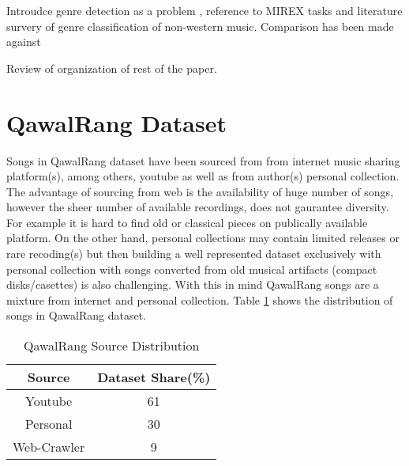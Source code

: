 \documentclass{article}
\begin{document}
Introudce genre detection as a problem \citep{music_genre_survey}, reference to MIREX tasks and literature survery of genre classification of non-western music. Comparison has been made against \citep{gtzan}

Review of organization of rest of the paper.

\section{QawalRang Dataset}\label{sec:data}
Songs in QawalRang dataset have been sourced from from internet music sharing platform(s), among others, youtube
 as well as from author(s) personal collection. The advantage of sourcing from web is the availability of huge number of songs, however the sheer number of available recordings, does not gaurantee diversity.  For example it is hard to find old or classical pieces on publically available platform. On the other hand, personal collections may contain limited releases or rare recoding(s) but then building a well represented dataset exclusively with personal collection with songs converted from old musical artifacts (compact disks/casettes) is also challenging. With this in mind QawalRang songs are a mixture from internet and personal collection. Table 
\ref{tab:sources} shows the distribution of songs in QawalRang dataset.
\begin{table}[htpb]
\centering
  \begin{tabular}{|c | c|}
  \toprule
  \bfseries Source & \bfseries Dataset Share(\%) \\
  \hline \hline
  Youtube  & 61 \\
  \hline
  Personal & 30 \\
  \hline
  Web-Crawler & 9  \\
  \bottomrule
  \end{tabular}
  \caption{QawalRang Source Distribution}
\label{tab:sources}
\end{table}
\end{document}
